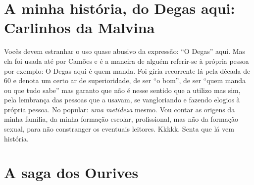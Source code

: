 \documentclass[12pt,brazil,]{book}
\begin{document}
\section{A minha história, do Degas aqui: Carlinhos da
Malvina}\label{a-minha-histuxf3ria-do-degas-aqui-carlinhos-da-malvina}

Vocês devem estranhar o uso quase abusivo da expressão: ``O Degas''
aqui. Mas ela foi usada até por Camões e é a maneira de alguém
referir-se à própria pessoa por exemplo: O Degas aqui é quem manda. Foi
gíria recorrente lá pela década de 60 e denota um certo ar de
superioridade, de ser ``o bom'', de ser ``quem manda ou que tudo sabe''
mas garanto que não é nesse sentido que a utilizo mas sim, pela
lembrança das pessoas que a usavam, se vangloriando e fazendo elogios à
própria pessoa. No popular: \emph{uma metideza} mesmo. Vou contar as
origens da minha família, da minha formação escolar, profissional, mas
não da formação sexual, para não constranger os eventuais leitores.
Kkkkk. Senta que lá vem história.

\section{A saga dos Ourives}\label{a-saga-dos-ourives}
\end{document}
